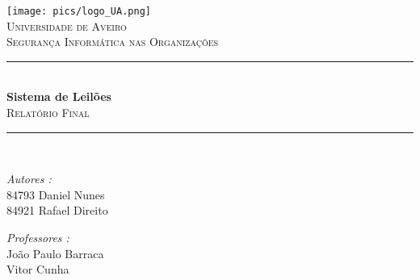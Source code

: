\documentclass[12pt]{article}
\date{\today}											%
\makeatletter
\let\thedate\@date
\makeatother
\begin{document}

\begin{titlepage}
	\centering
    \vspace*{0.5 cm}
    \texttt{[image: pics/logo\_UA.png]}\\[1.0 cm]	%
    \textsc{\LARGE Universidade de Aveiro }\\[2.0 cm]
	\textsc{\Large Segurança Informática nas Organizações}\\[0.5 cm]
	\rule{\linewidth}{0.2 mm} \\[0.4 cm]
	{ \huge \bfseries {Sistema de Leilões}}\\[0.5 cm]
	\textsc{\Large Relatório Final}\\	
	\rule{\linewidth}{0.2 mm} \\[1.5 cm]
	
	\begin{minipage}{0.4\textwidth}
		\begin{flushleft} \large
			\emph{Autores :}\\
			{84793 \quad Daniel Nunes}\\	
			{84921 \quad Rafael Direito}	
	    \end{flushleft}
	\end{minipage}
	\begin{minipage}{0.4\textwidth}
		\begin{flushright} \large
			\emph{Professores :} \\
			{João Paulo Barraca}\\
			{Vitor Cunha}
		\end{flushright}
	\end{minipage}\\[2 cm]
	
	\vspace*{\fill}
	{\large \thedate}
 
	\vfill
	
\end{titlepage}


\tableofcontents
\pagebreak

\listoffigures
\pagebreak


\lstlistoflistings
\pagebreak

\end{document}
